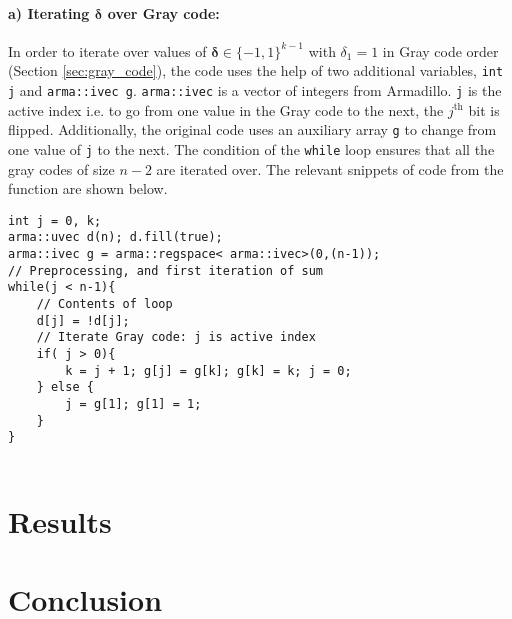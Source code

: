 \documentclass[11pt]{article}
\theoremstyle{theorem}
\theoremstyle{theorem}
\theoremstyle{remark}
\theoremstyle{note}
\theoremstyle{plain}
\theoremstyle{definition}
\begin{document}
\paragraph{a) Iterating $\mathbf{\delta}$ over Gray code:} In order to iterate over values of $\mathbf{\delta} \in \{-1, 1\}^{k-1}$ with $\delta_1 = 1$ in Gray code order (Section \ref{sec:gray_code}), the code uses the help of two additional variables, \texttt{int j} and \texttt{arma::ivec g}. \texttt{arma::ivec} is a vector of integers from Armadillo. \texttt{j} is the active index i.e. to go from one value in the Gray code to the next, the $j^\text{th}$ bit is flipped. Additionally, the original code uses an auxiliary array \texttt{g} to change from one value of  \texttt{j} to the next. The condition of the \texttt{while} loop ensures that all the gray codes of size $n-2$ are iterated over. The relevant snippets of code from the function are shown below.
\begin{verbatim}
int j = 0, k;
arma::uvec d(n); d.fill(true);
arma::ivec g = arma::regspace< arma::ivec>(0,(n-1));
// Preprocessing, and first iteration of sum
while(j < n-1){
    // Contents of loop
    d[j] = !d[j];
    // Iterate Gray code: j is active index
    if( j > 0){
        k = j + 1; g[j] = g[k]; g[k] = k; j = 0;
    } else {
        j = g[1]; g[1] = 1;
    }
}


\end{verbatim}


\section{Results}

\section{Conclusion}



\end{document}
